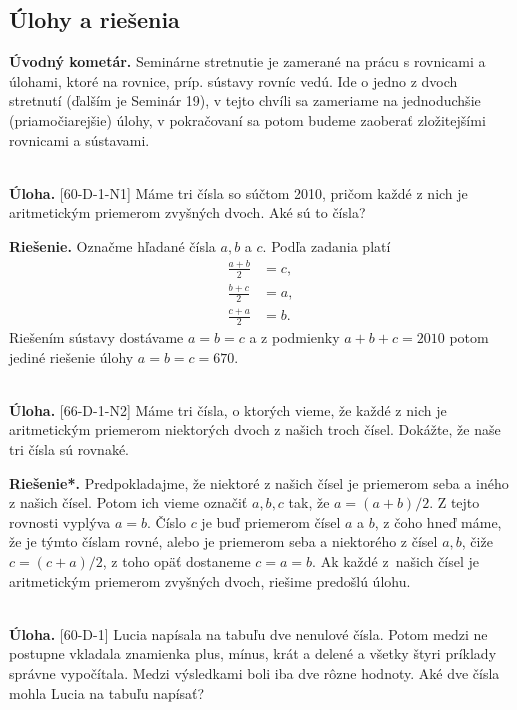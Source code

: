 \documentclass[11pt,a4paper,oneside,final]{book}
\newcommand{\ul}{\textbf{Úloha.} }
\newcommand{\rie}{\textbf{Riešenie.} }
\newcommand{\rieh}{\textbf{Riešenie*.} }
\begin{document}
\subsection*{Úlohy a riešenia}

\textbf{Úvodný kometár.} Seminárne stretnutie je zamerané na prácu s rovnicami a úlohami, ktoré na rovnice, príp. sústavy rovníc vedú. Ide o jedno z dvoch stretnutí (ďalším je Seminár 19), v tejto chvíli sa zameriame na jednoduchšie (priamočiarejšie) úlohy, v pokračovaní sa potom budeme zaoberať zložitejšími rovnicami a sústavami.\\
\\
\begin{tcolorbox}[breakable,notitle,boxrule=0pt,colback=light-gray,colframe=light-gray]\ul [60-D-1-N1] Máme tri čísla so súčtom 2010, pričom každé z nich je aritmetickým priemerom zvyšných dvoch. Aké sú to čísla?

\end{tcolorbox}

\rie Označme hľadané čísla $a,b$ a $c$. Podľa zadania platí
\begin{align*}
\frac{a+b}{2} &=c,\\
\frac{b+c}{2} &=a,\\
\frac{c+a}{2} &=b.
\end{align*}
Riešením sústavy dostávame $a=b=c$ a z podmienky $a+b+c=2010$ potom jediné riešenie úlohy $a=b=c=670$.\\
\\
\begin{tcolorbox}[breakable,notitle,boxrule=0pt,colback=light-gray,colframe=light-gray]\ul [66-D-1-N2] Máme tri čísla, o ktorých vieme, že každé z nich je aritmetickým priemerom niektorých dvoch z našich troch čísel. Dokážte, že naše tri čísla sú rovnaké.

\end{tcolorbox}

\rieh Predpokladajme, že niektoré z našich čísel je priemerom seba a iného z našich čísel. Potom ich vieme označiť $a, b, c$ tak, že $a = (a + b)/2$. Z tejto rovnosti vyplýva $a = b$. Číslo $c$ je buď priemerom čísel $a$ a $b$, z čoho hneď máme, že je týmto číslam rovné, alebo je priemerom seba a niektorého z čísel $a, b$, čiže $c = (c + a)/2$, z toho opäť dostaneme $c = a = b$. Ak každé z~našich čísel je aritmetickým priemerom zvyšných dvoch, riešime predošlú úlohu.\\
\\
\begin{tcolorbox}[breakable,notitle,boxrule=0pt,colback=light-gray,colframe=light-gray]\ul [60-D-1]
Lucia napísala na tabuľu dve nenulové čísla. Potom medzi ne postupne vkladala znamienka plus, mínus, krát a delené a všetky štyri príklady správne vypočítala. Medzi výsledkami boli iba dve rôzne hodnoty. Aké dve čísla mohla Lucia na tabuľu napísať?

\end{tcolorbox}
\end{document}
